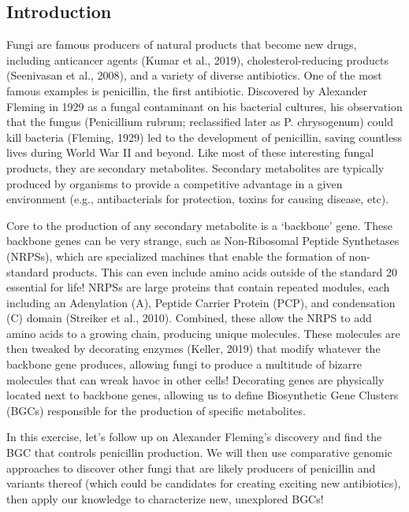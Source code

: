 \documentclass[
  letterpaper,
  DIV=11,
  numbers=noendperiod]{scrreprt}
\begin{document}

\subsection*{Introduction}\label{introduction-6}

Fungi are famous producers of natural products that become new drugs,
including anticancer agents (Kumar et al., 2019), cholesterol-reducing
products (Seenivasan et al., 2008), and a variety of diverse
antibiotics. One of the most famous examples is penicillin, the first
antibiotic. Discovered by Alexander Fleming in 1929 as a fungal
contaminant on his bacterial cultures, his observation that the fungus
(Penicillium rubrum; reclassified later as P. chrysogenum) could kill
bacteria (Fleming, 1929) led to the development of penicillin, saving
countless lives during World War II and beyond. Like most of these
interesting fungal products, they are secondary metabolites. Secondary
metabolites are typically produced by organisms to provide a competitive
advantage in a given environment (e.g., antibacterials for protection,
toxins for causing disease, etc).

Core to the production of any secondary metabolite is a `backbone' gene.
These backbone genes can be very strange, such as Non-Ribosomal Peptide
Synthetases (NRPSs), which are specialized machines that enable the
formation of non-standard products. This can even include amino acids
outside of the standard 20 essential for life! NRPSs are large proteins
that contain repeated modules, each including an Adenylation (A),
Peptide Carrier Protein (PCP), and condensation (C) domain (Streiker et
al., 2010). Combined, these allow the NRPS to add amino acids to a
growing chain, producing unique molecules. These molecules are then
tweaked by decorating enzymes (Keller, 2019) that modify whatever the
backbone gene produces, allowing fungi to produce a multitude of bizarre
molecules that can wreak havoc in other cells! Decorating genes are
physically located next to backbone genes, allowing us to define
Biosynthetic Gene Clusters (BGCs) responsible for the production of
specific metabolites.

In this exercise, let's follow up on Alexander Fleming's discovery and
find the BGC that controls penicillin production. We will then use
comparative genomic approaches to discover other fungi that are likely
producers of penicillin and variants thereof (which could be candidates
for creating exciting new antibiotics), then apply our knowledge to
characterize new, unexplored BGCs!
\end{document}

